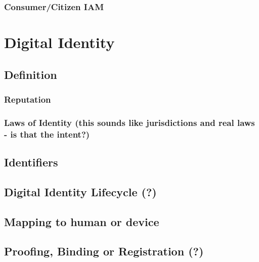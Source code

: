 \hypertarget{consumercitizen-iam}{%
\subsection{Consumer/Citizen IAM}\label{consumercitizen-iam}}

\hypertarget{digital-identity}{%
\chapter{Digital Identity}\label{digital-identity}}

\hypertarget{definition}{%
\section{Definition}\label{definition}}

\hypertarget{reputation}{%
\subsection{Reputation}\label{reputation}}

\hypertarget{laws-of-identity-this-sounds-like-jurisdictions-and-real-laws---is-that-the-intent}{%
\subsection{Laws of Identity (this sounds like jurisdictions and real
laws - is that the
intent?)}\label{laws-of-identity-this-sounds-like-jurisdictions-and-real-laws---is-that-the-intent}}

\hypertarget{identifiers}{%
\section{Identifiers}\label{identifiers}}

\hypertarget{digital-identity-lifecycle}{%
\section{Digital Identity Lifecycle
(?)}\label{digital-identity-lifecycle}}

\hypertarget{mapping-to-human-or-device}{%
\section{Mapping to human or
device}\label{mapping-to-human-or-device}}

\hypertarget{proofing-binding-or-registration}{%
\section{Proofing, Binding or Registration
(?)}\label{proofing-binding-or-registration}}

